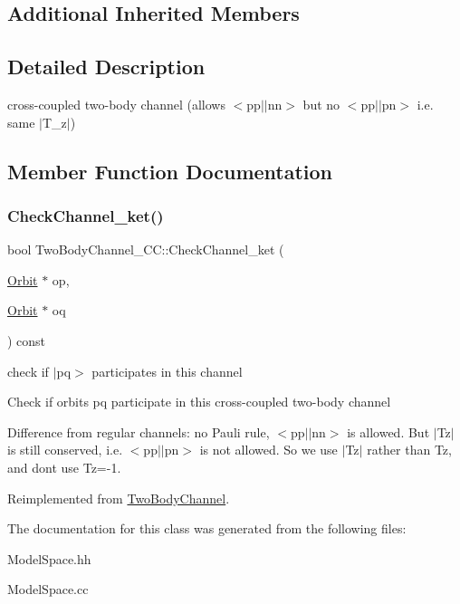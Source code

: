 \subsection*{Additional Inherited Members}


\subsection{Detailed Description}
cross-\/coupled two-\/body channel (allows $<$pp$\vert$$\vert$nn$>$ but no $<$pp$\vert$$\vert$pn$>$ i.\+e. same $\vert$\+T\+\_\+z$\vert$) 

\subsection{Member Function Documentation}
\mbox{\label{classTwoBodyChannel__CC_a9a73ccfd9ba18bbc840547669254ef79}} 
\subsubsection{\texorpdfstring{Check\+Channel\+\_\+ket()}{CheckChannel\_ket()}}
{\footnotesize\ttfamily bool Two\+Body\+Channel\+\_\+\+C\+C\+::\+Check\+Channel\+\_\+ket (\begin{DoxyParamCaption}\item[{\hyperlink{classOrbit}{Orbit} $\ast$}]{op,  }\item[{\hyperlink{classOrbit}{Orbit} $\ast$}]{oq }\end{DoxyParamCaption}) const\hspace{0.3cm}{\ttfamily [virtual]}}



check if $\vert$pq$>$ participates in this channel 

Check if orbits pq participate in this cross-\/coupled two-\/body channel

Difference from regular channels\+: no Pauli rule, $<$pp$\vert$$\vert$nn$>$ is allowed. But $\vert$\+Tz$\vert$ is still conserved, i.\+e. $<$pp$\vert$$\vert$pn$>$ is not allowed. So we use $\vert$\+Tz$\vert$ rather than Tz, and don\textquotesingle{}t use Tz=-\/1. 

Reimplemented from \hyperlink{classTwoBodyChannel_aa02ee6c87c6499a93233d58dc6553b48}{Two\+Body\+Channel}.



The documentation for this class was generated from the following files\+:\begin{DoxyCompactItemize}
\item 
Model\+Space.\+hh\item 
Model\+Space.\+cc\end{DoxyCompactItemize}

